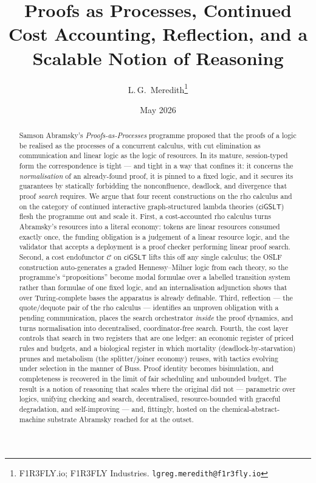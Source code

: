 \documentclass[11pt]{article}
\title{\textbf{Proofs as Processes, Continued}\\[4pt]
\large Cost Accounting, Reflection, and a Scalable Notion of Reasoning}
\author{L.\,G.\ Meredith\thanks{F1R3FLY.io; F1R3FLY Industries.
\texttt{lgreg.meredith@f1r3fly.io}}}
\date{May 2026}
\theoremstyle{definition}
\theoremstyle{plain}
\newcommand{\C}{\mathcal{C}}
\newcommand{\ciGSLT}{\mathsf{ciGSLT}}
\begin{document}
\maketitle

\begin{abstract}
\noindent
Samson Abramsky's \emph{Proofs-as-Processes} programme proposed that the
proofs of a logic be realised as the processes of a concurrent calculus, with
cut elimination as communication and linear logic as the logic of resources.
In its mature, session-typed form the correspondence is tight --- and tight in
a way that confines it: it concerns the \emph{normalisation} of an
already-found proof, it is pinned to a fixed logic, and it secures its
guarantees by statically forbidding the nonconfluence, deadlock, and
divergence that proof \emph{search} requires. We argue that four recent
constructions on the rho calculus and on the category of continued interactive
graph-structured lambda theories ($\ciGSLT$) flesh the programme out and scale
it. First, a cost-accounted rho calculus turns Abramsky's resources into a
literal economy: tokens are linear resources consumed exactly once, the funding
obligation is a judgement of a linear resource logic, and the validator that
accepts a deployment is a proof checker performing linear proof search. Second,
a cost endofunctor $\C$ on $\ciGSLT$ lifts this off any single calculus; the
OSLF construction auto-generates a graded Hennessy--Milner logic from each
theory, so the programme's ``propositions'' become modal formulae over a
labelled transition system rather than formulae of one fixed logic, and an
internalisation adjunction shows that over Turing-complete bases the apparatus
is already definable. Third, reflection --- the quote/dequote pair of the rho
calculus --- identifies an unproven obligation with a pending communication,
places the search orchestrator \emph{inside} the proof dynamics, and turns
normalisation into decentralised, coordinator-free search. Fourth, the cost
layer controls that search in two registers that are one ledger: an economic
register of priced rules and budgets, and a biological register in which
mortality (deadlock-by-starvation) prunes and metabolism (the splitter/joiner
economy) reuses, with tactics evolving under selection in the manner of Buss.
Proof identity becomes bisimulation, and completeness is recovered in the limit
of fair scheduling and unbounded budget. The result is a notion of reasoning
that scales where the original did not --- parametric over logics, unifying
checking and search, decentralised, resource-bounded with graceful degradation,
and self-improving --- and, fittingly, hosted on the chemical-abstract-machine
substrate Abramsky reached for at the outset.
\end{abstract}
\end{document}
